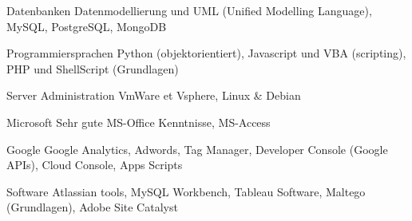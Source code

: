 

\begin{cvskills}

  \cvskill
    {Datenbanken} %
    {Datenmodellierung und UML (Unified Modelling Language), MySQL, PostgreSQL, MongoDB} %
    
  \cvskill
	{Programmiersprachen} %
	{Python (objektorientiert), Javascript und VBA (scripting), PHP und ShellScript (Grundlagen)} %

  \cvskill
	{Server Administration} %
	{VmWare et Vsphere, Linux \& Debian} %
	
  \cvskill
	{Microsoft} %
	{Sehr gute MS-Office Kenntnisse, MS-Access} %

  \cvskill
	{Google} %
	{Google Analytics, Adwords, Tag Manager, Developer Console (Google APIs), Cloud Console, Apps Scripts} %

  \cvskill
    {Software} %
    {Atlassian tools, MySQL Workbench, Tableau Software, Maltego (Grundlagen), Adobe Site Catalyst} %


\end{cvskills}
